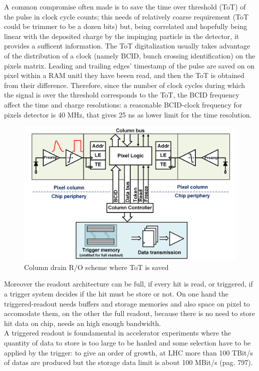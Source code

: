    A common compromise often made is to save the time over threshold (ToT) of the pulse in clock cycle counts; this needs of relatively coarse requirement (ToT could be trimmer to be a dozen bits) but, being correlated and hopefully being linear with the deposited charge by the impinging particle in the detector, it provides a sufficent information.
   The ToT digitalization usually takes advantage of the distribution of a clock (namely BCID,  bunch crossing identification) on the pixels matrix. Leading and trailing edges' timestamp of the pulse are saved on on pixel within a RAM unitl they have beeen read,  and then the ToT is obtained from their difference. Therefore, since the number of clock cycles during which the signal is over the threshold corresponds to the ToT, the BCID frequency affect the time and charge resolutions: a reasonable BCID-clock frequency for pixels detector is 40 MHz, that gives 25 ns as lower limit for the time resolution.\\
   \begin{figure}[h!]
      \centering
      \includegraphics[width=.7\linewidth]{figures/Pixel_detectors/column_drain_RO.png}
      \caption{Column drain R/O scheme where ToT is saved}
      \label{fig:column_drain_RO-like}
   \end{figure}

   Moreover the readout architecture can be full, if every hit is read, or triggered, if a trigger system decides if the hit must be store or not. On one hand the triggered-readout needs buffers and storage memories and also space on pixel to accomodate them, on the other the full readout, because there is no need to store hit data on chip, needs an high enough bandwidth.\\
   A triggered readout is foundamental in accelerator experiments where the quantity of data to store is too large to be hanled and some selection have to be applied by the trigger: to give an order of growth, at LHC more than 100 TBit/s of datas are produced but the storage data limit is about 100 MBit/s \cite{K-Wermes} (pag. 797).\\
 
